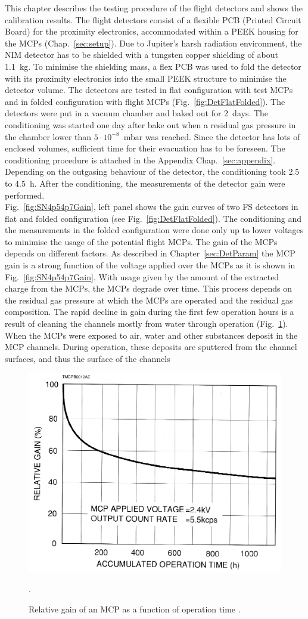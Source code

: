 	This chapter describes the testing procedure of the flight detectors and shows the calibration results. The flight detectors consist of a flexible PCB (Printed Circuit Board) for the proximity electronics, accommodated within a PEEK housing for the MCPs (Chap.~\ref{sec:setup}). Due to Jupiter's harsh radiation environment, the NIM detector has to be shielded with a tungsten copper shielding of about 1.1~kg. To minimise the shielding mass, a flex PCB was used to fold the detector with its proximity electronics into the small PEEK structure to minimise the detector volume. The detectors are tested in flat configuration with test MCPs and in folded configuration with flight MCPs (Fig.~\ref{fig:DetFlatFolded}). The detectors were put in a vacuum chamber and baked out for 2~days. The conditioning was started one day after bake out when a residual gas pressure in the chamber lower than $5\cdot10^{-8}$~mbar was reached. Since the detector has lots of enclosed volumes, sufficient time for their evacuation has to be foreseen. The conditioning procedure is attached in the Appendix Chap.~\ref{sec:appendix}. Depending on the outgasing behaviour of the detector, the conditioning took 2.5 to 4.5~h. After the conditioning, the measurements of the detector gain were performed.\\
	Fig.~\ref{fig:SN4p54p7Gain}, left panel shows the gain curves of two FS detectors in flat and folded configuration (see Fig.~\ref{fig:DetFlatFolded}). The conditioning and the measurements in the folded configuration were done only up to lower voltages to minimise the usage of the potential flight MCPs. The gain of the MCPs depends on different factors. As described in Chapter~\ref{sec:DetParam} the MCP gain is a strong function of the voltage applied over the MCPs as it is shown in Fig.~\ref{fig:SN4p54p7Gain}. With usage given by the amount of the extracted charge from the MCPs, the MCPs degrade over time. This process depends on the residual gas pressure at which the MCPs are operated and the residual gas composition. The rapid decline in gain during the first few operation hours is a result of cleaning the channels mostly from water through operation (Fig.~\ref{fig:MCPrelGainTime}). When the MCPs were exposed to air, water and other substances deposit in the MCP channels. During operation, these deposits are sputtered from the channel surfaces, and thus the surface of the channels 
	\begin{figure}[H] %
		\centering
		\includegraphics[width=.5\textwidth]{Experiments/MCP_relGain_timeevol.png}
		\caption{Relative gain of an MCP as a function of operation time \cite{LecNot_Wurz2017}.}
		\label{fig:MCPrelGainTime}.
	\end{figure}
